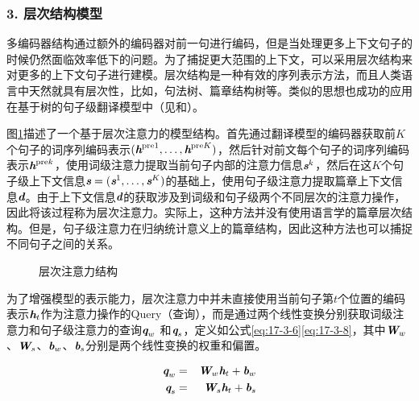 
\subsubsection{3. 层次结构模型}


\parinterval 多编码器结构通过额外的编码器对前一句进行编码，但是当处理更多上下文句子的时候仍然面临效率低下的问题。为了捕捉更大范围的上下文，可以采用层次结构来对更多的上下文句子进行建模。层次结构是一种有效的序列表示方法，而且人类语言中天然就具有层次性，比如，句法树、篇章结构树等。类似的思想也成功的应用在基于树的句子级翻译模型中（见{\chaptereight}和{\chapterfifteen}）。

\parinterval 图\ref{fig:17-19}描述了一个基于层次注意力的模型结构。首先通过翻译模型的编码器获取前$K$个句子的词序列编码表示$(\textbf{\em h}^{\textrm{pre}1},\dots,\textbf{\em h}^{\textrm{pre}K})$，然后针对前文每个句子的词序列编码表示$\textbf{\em h}^{\textrm{pre}k}$，使用词级注意力提取当前句子内部的注意力信息$\textbf{\em s}^{k}$，然后在这$K$个句子级上下文信息$\textbf{\em s}=(\textbf{\em s}^1,\dots,\textbf{\em s}^K)$的基础上，使用句子级注意力提取篇章上下文信息$\textbf{\em d}$。由于上下文信息$\textbf{\em d}$的获取涉及到词级和句子级两个不同层次的注意力操作，因此将该过程称为层次注意力。实际上，这种方法并没有使用语言学的篇章层次结构。但是，句子级注意力在归纳统计意义上的篇章结构，因此这种方法也可以捕捉不同句子之间的关系。

\begin{figure}[htp]
    \centering
	
    \caption{层次注意力结构}
    \label{fig:17-19}
\end{figure}

\parinterval 为了增强模型的表示能力，层次注意力中并未直接使用当前句子第$t$个位置的编码表示$\textbf{\em h}_{t}$作为注意力操作的Query（查询），而是通过两个线性变换分别获取词级注意力和句子级注意力的查询$\textbf{\em q}_{w}$ 和$\textbf{\em q}_{s}$，定义如公式\eqref{eq:17-3-6}\eqref{eq:17-3-8}，其中${\textbf{\em W}}_w$、${\textbf{\em W}}_s$、${\textbf{\em b}}_w$、${\textbf{\em b}}_s$分别是两个线性变换的权重和偏置。

\begin{eqnarray}
\textbf{\em q}_{w}&=&{\textbf{\em W}}_w \textbf{\em h}_t+{\textbf{\em b}}_w
\label{eq:17-3-6}\\
\textbf{\em q}_{s}&=&{\textbf{\em W}}_s \textbf{\em h}_t+{\textbf{\em b}}_s
\label{eq:17-3-8}
\end{eqnarray}


